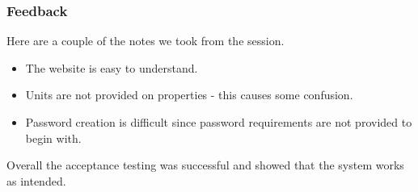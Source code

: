\subsubsection{Feedback}
Here are a couple of the notes we took from the session.
\begin{itemize}
	\item The website is easy to understand.
	\item Units are not provided on properties - this causes some confusion.
	\item Password creation is difficult since password requirements are not provided to begin with.
\end{itemize}
Overall the acceptance testing was successful and showed that the system works as intended.